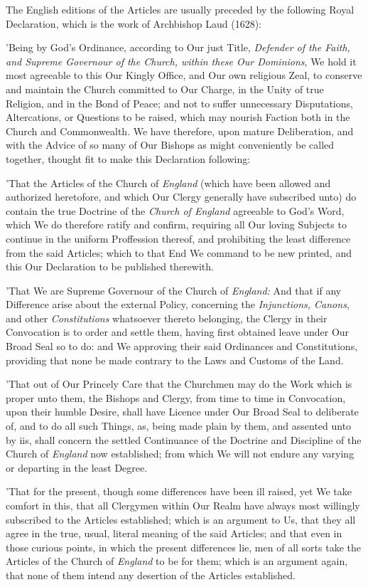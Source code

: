 The English editions of the Articles are usually preceded by the following Royal Declaration, which is the work of Archbishop Laud (1628):

'Being by God's Ordinance, according to Our just Title, \emph{Defender of the Faith, and Supreme Governour of the Church, within these Our Dominions}, We hold it most agreeable to this Our Kingly Office, and Our own religious Zeal, to conserve and maintain the Church committed to Our Charge, in the Unity of true Religion, and in the Bond of Peace; and not to suffer unnecessary Disputations, Altercations, or Questions to be raised, which may nourish Faction both in the Church and Commonwealth. We have therefore, upon mature Deliberation, and with the Advice of so many of Our Bishops as might conveniently be called together, thought fit to make this Declaration following:

'That the Articles of the Church of \emph{England} (which have been allowed and authorized heretofore, and which Our Clergy generally have subscribed unto) do contain the true Doctrine of the \emph{Church of England} agreeable to God's Word, which We do therefore ratify and confirm, requiring all Our loving Subjects to continue in the uniform Proffession thereof, and prohibiting the least difference from the said Articles; which to that End We command to be new printed, and this Our Declaration to be published therewith.

'That We are Supreme Governour of the Church of \emph{England: } And that if any Difference arise about the external Policy, concerning the \emph{Injunctions, Canons}, and other \emph{Constitutions} whatsoever thereto belonging, the Clergy in their Convocation is to order and settle them, having first obtained leave under Our Broad Seal so to do: and We approving their said Ordinances and Constitutions, providing that none be made contrary to the Laws and Customs of the Land.

'That out of Our Princely Care that the Churchmen may do the Work which is proper unto them, the Bishops and Clergy, from time to time in Convocation, upon their humble Desire, shall have Licence under Our Broad Seal to deliberate of, and to do all such Things, as, being made plain by them, and assented unto by iis, shall concern the settled Continuance of the Doctrine and Discipline of the Church of \emph{England} now established; from which We will not endure any varying or departing in the least Degree.

'That for the present, though some differences have been ill raised, yet We take comfort in this, that all Clergymen within Our Realm have always most willingly subscribed to the Articles established; which is an argument to Us, that they all agree in the true, usual, literal meaning of the said Articles; and that even in those curious points, in which the present differences lie, men of all sorts take the Articles of the Church of \emph{England} to be for them; which is an argument again, that none of them intend any desertion of the Articles established.

